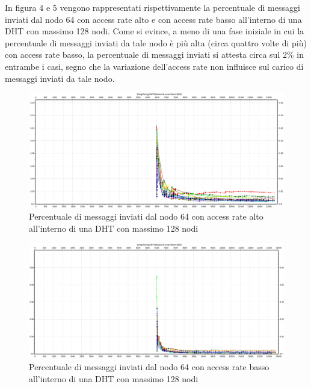 \documentclass[	
	DIV=calc,
	paper=a4,
	fontsize=11pt,
	onecolumn
]{scrartcl} %
\begin{document}
	In figura 4 e 5 vengono rappresentati rispettivamente la percentuale di messaggi inviati dal nodo 64 con access rate alto e con access rate basso all'interno di una DHT con massimo 128 nodi. Come si evince, a meno di una fase iniziale in cui la percentuale di messaggi inviati da tale nodo è più alta (circa quattro volte di più) con access rate basso, la percentuale di messaggi inviati si attesta circa sul 2\% in entrambe i casi, segno che la variazione dell'access rate non influisce sul carico di messaggi inviati da tale nodo.
	
	\begin{figure}[H]
		\centering
		\includegraphics[scale=0.35]	{SymphonyDHT/plots/PercentageOfMessagesSent/128_Nodes_FastAccess/SymphonyDHT_128Nodes_FastAccess_Node64.png}
		\caption{Percentuale di messaggi inviati dal nodo 64 con access rate alto all'interno di una DHT con massimo 128 nodi}
		\label{Figura 4}
	\end{figure}
	\begin{figure}[H]
		\centering
		\includegraphics[scale=0.35]	{SymphonyDHT/plots/PercentageOfMessagesSent/128_Nodes_SlowAccess/SymphonyDHT_128Nodes_SlowAccess_Node64.png}
		\caption{Percentuale di messaggi inviati dal nodo 64 con access rate basso all'interno di una DHT con massimo 128 nodi}
		\label{Figura 5}
	\end{figure}
	
\end{document}
